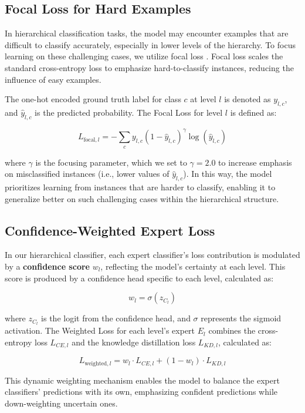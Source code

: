 \documentclass[9pt,a4paper,twoside]{rho-class/rho}
\begin{document}
\subsection{Focal Loss for Hard Examples}

In hierarchical classification tasks, the model may encounter examples that are difficult to classify accurately, especially in lower levels of the hierarchy. To focus learning on these challenging cases, we utilize focal loss \cite{ross2017focal}. Focal loss scales the standard cross-entropy loss to emphasize hard-to-classify instances, reducing the influence of easy examples. 

The one-hot encoded ground truth label for class \(c\) at level \(l\) is denoted as \( y_{l,c} \), and \( \hat{y}_{l,c} \) is the predicted probability. The Focal Loss for level \(l\) is defined as:

\[
L_{\text{focal}, l} = - \sum_{c} y_{l,c} (1 - \hat{y}_{l,c})^{\gamma} \log(\hat{y}_{l,c})
\]

where \(\gamma\) is the focusing parameter, which we set to \( \gamma = 2.0 \) to increase emphasis on misclassified instances (i.e., lower values of \( \hat{y}_{l,c} \)). In this way, the model prioritizes learning from instances that are harder to classify, enabling it to generalize better on such challenging cases within the hierarchical structure.

\subsection{Confidence-Weighted Expert Loss}

In our hierarchical classifier, each expert classifier's loss contribution is modulated by a \textbf{confidence score} \( w_l \), reflecting the model's certainty at each level. This score is produced by a confidence head specific to each level, calculated as:

\[
w_l = \sigma(z_{C_l})
\]

where \( z_{C_l} \) is the logit from the confidence head, and \( \sigma \) represents the sigmoid activation. The Weighted Loss for each level’s expert \( E_l \) combines the cross-entropy loss \( L_{CE, l} \) and the knowledge distillation loss \( L_{KD, l} \), calculated as:

\[
L_{\text{weighted}, l} = w_l \cdot L_{CE, l} + (1 - w_l) \cdot L_{KD, l}
\]

This dynamic weighting mechanism enables the model to balance the expert classifiers' predictions with its own, emphasizing confident predictions while down-weighting uncertain ones.
\end{document}
